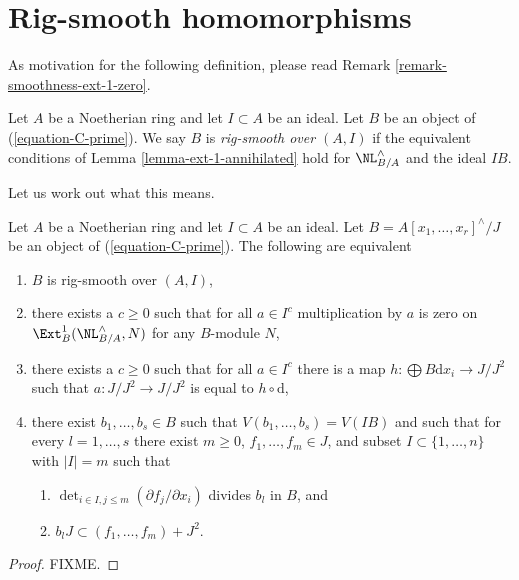 \section{Rig-smooth homomorphisms}
\label{section-rig-smooth}

\noindent
As motivation for the following definition, please read Remark
\ref{remark-smoothness-ext-1-zero}.

\begin{definition}
\label{definition-rig-smooth-homomorphism}
Let $A$ be a Noetherian ring and let $I \subset A$ be an ideal.
Let $B$ be an object of (\ref{equation-C-prime}). We say
$B$ is {\it rig-smooth over $(A, I)$} if the equivalent
conditions of Lemma \ref{lemma-ext-1-annihilated} hold for $\NL^\wedge_{B/A}$
and the ideal $IB$.
\end{definition}

\noindent
Let us work out what this means.

\begin{lemma}
\label{lemma-equivalent-with-artin-smooth}
Let $A$ be a Noetherian ring and let $I \subset A$ be an ideal.
Let $B = A[x_1, \ldots, x_r]^\wedge/J$ be an object of
(\ref{equation-C-prime}). The following are equivalent
\begin{enumerate}
\item $B$ is rig-smooth over $(A, I)$,
\item there exists a $c \geq 0$ such that for all $a \in I^c$
multiplication by $a$ is zero on $\Ext^1_B(\NL_{B/A}^\wedge, N)$
for any $B$-module $N$,
\item there exists a $c \geq 0$ such that for all $a \in I^c$
there is a map $h : \bigoplus B\text{d}x_i \to J/J^2$ such that
$a : J/J^2 \to J/J^2$ is equal to $h \circ \text{d}$,
\item there exist $b_1, \ldots, b_s \in B$ such that
$V(b_1, \ldots, b_s) = V(IB)$ and such that for every
$l = 1, \ldots, s$ there exist $m \geq 0$, $f_1, \ldots, f_m \in J$,
and subset $I \subset \{1, \ldots, n\}$ with $|I| = m$ such that
\begin{enumerate}
\item $\det_{i \in I, j \leq m}(\partial f_j/ \partial x_i)$
divides $b_l$ in $B$, and
\item $b_l J \subset (f_1, \ldots, f_m) + J^2$.
\end{enumerate}
\end{enumerate}
\end{lemma}

\begin{proof}
FIXME.
\end{proof}

